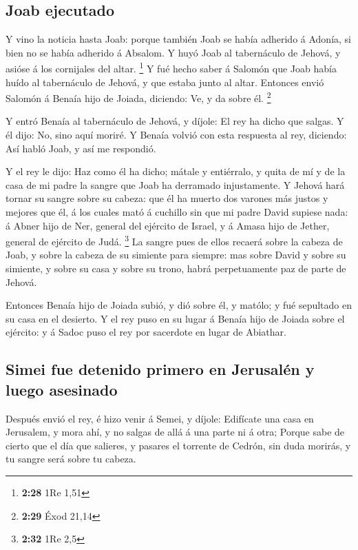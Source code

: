 \hypertarget{joab-ejecutado}{%
\subsection{Joab ejecutado}\label{joab-ejecutado}}

 Y vino la noticia hasta Joab: porque también Joab se había
adherido á Adonía, si bien no se había adherido á Absalom. Y huyó Joab
al tabernáculo de Jehová, y asióse á los cornijales del altar.
\footnote{\textbf{2:28} 1Re 1,51}  Y fué hecho saber á
Salomón que Joab había huído al tabernáculo de Jehová, y que estaba
junto al altar. Entonces envió Salomón á Benaía hijo de Joiada,
diciendo: Ve, y da sobre él. \footnote{\textbf{2:29} Éxod 21,14}

 Y entró Benaía al tabernáculo de Jehová, y díjole: El rey
ha dicho que salgas. Y él dijo: No, sino aquí moriré. Y Benaía volvió
con esta respuesta al rey, diciendo: Así habló Joab, y así me respondió.

 Y el rey le dijo: Haz como él ha dicho; mátale y
entiérralo, y quita de mí y de la casa de mi padre la sangre que Joab ha
derramado injustamente.  Y Jehová hará tornar su sangre
sobre su cabeza: que él ha muerto dos varones más justos y mejores que
él, á los cuales mató á cuchillo sin que mi padre David supiese nada: á
Abner hijo de Ner, general del ejército de Israel, y á Amasa hijo de
Jether, general de ejército de Judá. \footnote{\textbf{2:32} 1Re 2,5}
 La sangre pues de ellos recaerá sobre la cabeza de Joab, y
sobre la cabeza de su simiente para siempre: mas sobre David y sobre su
simiente, y sobre su casa y sobre su trono, habrá perpetuamente paz de
parte de Jehová.

 Entonces Benaía hijo de Joiada subió, y dió sobre él, y
matólo; y fué sepultado en su casa en el desierto.  Y el
rey puso en su lugar á Benaía hijo de Joiada sobre el ejército: y á
Sadoc puso el rey por sacerdote en lugar de Abiathar.

\hypertarget{simei-fue-detenido-primero-en-jerusaluxe9n-y-luego-asesinado}{%
\subsection{Simei fue detenido primero en Jerusalén y luego
asesinado}\label{simei-fue-detenido-primero-en-jerusaluxe9n-y-luego-asesinado}}

 Después envió el rey, é hizo venir á Semei, y díjole:
Edifícate una casa en Jerusalem, y mora ahí, y no salgas de allá á una
parte ni á otra;  Porque sabe de cierto que el día que
salieres, y pasares el torrente de Cedrón, sin duda morirás, y tu sangre
será sobre tu cabeza.

